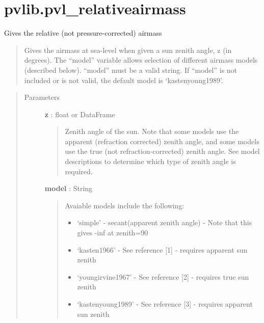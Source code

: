 \documentclass[letterpaper,10pt,english]{sphinxmanual}
\begin{document}
\section{pvlib.pvl\_relativeairmass}
\label{stubs/pvlib.pvl_relativeairmass:pvlib-pvl-relativeairmass}\label{stubs/pvlib.pvl_relativeairmass::doc}

\begin{fulllineitems}
\label{stubs/pvlib.pvl_relativeairmass:pvlib.pvl_relativeairmass}
Gives the relative (not pressure-corrected) airmass
\begin{quote}

Gives the airmass at sea-level when given a sun zenith angle, z (in 
degrees). 
The ``model'' variable allows selection of different airmass models
(described below). ``model'' must be a valid string. If ``model'' is not 
included or is not valid, the default model is `kastenyoung1989'.
\end{quote}
\begin{quote}\begin{description}
\item[{Parameters}] \leavevmode
\textbf{z} : float or DataFrame
\begin{quote}

Zenith angle of the sun.  Note that some models use the apparent (refraction corrected)
zenith angle, and some models use the true (not refraction-corrected)
zenith angle. See model descriptions to determine which type of zenith
angle is required.
\end{quote}

\textbf{model} : String
\begin{quote}

Avaiable models include the following:
\begin{itemize}
\item {} 
`simple' - secant(apparent zenith angle) - Note that this gives -inf at zenith=90

\item {} 
`kasten1966' - See reference {[}1{]} - requires apparent sun zenith

\item {} 
`youngirvine1967' - See reference {[}2{]} - requires true sun zenith

\item {} 
`kastenyoung1989' - See reference {[}3{]} - requires apparent sun zenith


\end{itemize}
\end{quote}
\end{description}
\end{quote}
\end{fulllineitems}
\end{document}
